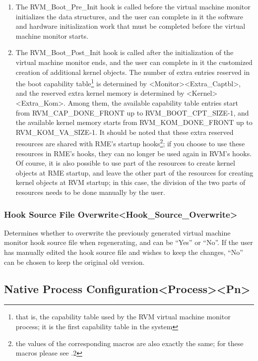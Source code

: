 \begin{enumerate}
\def\labelenumi{\arabic{enumi}.}
\item
  The RVM\_Boot\_Pre\_Init hook is called before the virtual machine monitor initializes the data structures, and the user can complete in it the software and hardware initialization work that must be completed before the virtual machine monitor starts.
\item
  The RVM\_Boot\_Post\_Init hook is called after the initialization of the virtual machine monitor ends, and the user can complete in it the customized creation of additional kernel objects. The number of extra entries reserved in the boot capability table\footnote{that is, the capability table used by the RVM virtual machine monitor process; it is the first capability table in the system} is determined by <Monitor><Extra\_Captbl>, and the reserved extra kernel memory is determined by <Kernel><Extra\_Kom>. Among them, the available capability table entries start from RVM\_CAP\_DONE\_FRONT up to RVM\_BOOT\_CPT\_SIZE-1, and the available kernel memory starts from RVM\_KOM\_DONE\_FRONT up to RVM\_KOM\_VA\_SIZE-1. It should be noted that these extra reserved resources are shared with RME's startup hooks\footnote{the values of the corresponding macros are also exactly the same; for these macros please see .2}; if you choose to use these resources in RME's hooks, they can no longer be used again in RVM's hooks. Of course, it is also possible to use part of the resources to create kernel objects at RME startup, and leave the other part of the resources for creating kernel objects at RVM startup; in this case, the division of the two parts of resources needs to be done manually by the user.
\end{enumerate}

\subsubsection{Hook Source File Overwrite<Hook\_Source\_Overwrite>{}}\label{subsubsec:5-3-13-22}

Determines whether to overwrite the previously generated virtual machine monitor hook source file when regenerating, and can be ``Yes'' or ``No''. If the user has manually edited the hook source file and wishes to keep the changes, ``No'' can be chosen to keep the original old version.

\subsection{Native Process Configuration<Process><Pn>{}}\label{subsec:5-3-14}

